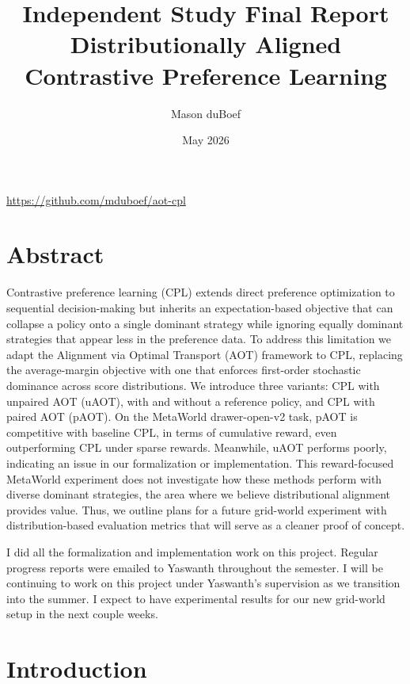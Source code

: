 \documentclass[11pt]{article}
\title{Independent Study Final Report \\ \large Distributionally Aligned Contrastive Preference Learning}
\author{Mason duBoef}
\date{May 2026}
\begin{document}
\maketitle

\begin{center}
    \url{https://github.com/mduboef/aot-cpl}
\end{center}

\section*{Abstract}

Contrastive preference learning (CPL) extends direct preference optimization to sequential decision-making but inherits an expectation-based objective that can collapse a policy onto a single dominant strategy while ignoring equally dominant strategies that appear less in the preference data. To address this limitation we adapt the Alignment via Optimal Transport (AOT) framework to CPL, replacing the average-margin objective with one that enforces first-order stochastic dominance across score distributions. We introduce three variants: CPL with unpaired AOT (uAOT), with and without a reference policy, and CPL with paired AOT (pAOT). On the MetaWorld drawer-open-v2 task, pAOT is competitive with baseline CPL, in terms of cumulative reward, even outperforming CPL under sparse rewards. Meanwhile, uAOT performs poorly, indicating an issue in our formalization or implementation. This reward-focused MetaWorld experiment does not investigate how these methods perform with diverse dominant strategies, the area where we believe distributional alignment provides value. Thus, we outline plans for a future grid-world experiment with distribution-based evaluation metrics that will serve as a cleaner proof of concept.


I did all the formalization and implementation work on this project. Regular progress reports were emailed to Yaswanth throughout the semester. I will be continuing to work on this project under Yaswanth's supervision as we transition into the summer. I expect to have experimental results for our new grid-world setup in the next couple weeks.

\section{Introduction}
\end{document}
